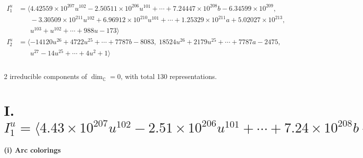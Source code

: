\documentclass[1p]{elsarticle_modified}
\theoremstyle{definition}
\begin{document}
\begin{align*}
I^u_{1}&=\langle 
4.42559\times10^{207} u^{102}-2.50511\times10^{206} u^{101}+\cdots+7.24447\times10^{208} b-6.34599\times10^{209},\\
\phantom{I^u_{1}}&\phantom{= \langle  }-3.30509\times10^{211} u^{102}+6.96912\times10^{210} u^{101}+\cdots+1.25329\times10^{211} a+5.02027\times10^{213},\\
\phantom{I^u_{1}}&\phantom{= \langle  }u^{103}+u^{102}+\cdots+988 u-173\rangle \\
I^u_{2}&=\langle 
-14120 u^{26}+4722 u^{25}+\cdots+7787 b-8083,\;18524 u^{26}+2179 u^{25}+\cdots+7787 a-2475,\\
\phantom{I^u_{2}}&\phantom{= \langle  }u^{27}-14 u^{25}+\cdots+4 u^2+1\rangle \\
\\
\end{align*}
\raggedright * 2 irreducible components of $\dim_{\mathbb{C}}=0$, with total 130 representations.\\
\newpage
\renewcommand{\arraystretch}{1}
\centering \section*{I. $I^u_{1}= \langle 4.43\times10^{207} u^{102}-2.51\times10^{206} u^{101}+\cdots+7.24\times10^{208} b-6.35\times10^{209},\;-3.31\times10^{211} u^{102}+6.97\times10^{210} u^{101}+\cdots+1.25\times10^{211} a+5.02\times10^{213},\;u^{103}+u^{102}+\cdots+988 u-173 \rangle$}
\flushleft \textbf{(i) Arc colorings}\\
\end{document}
